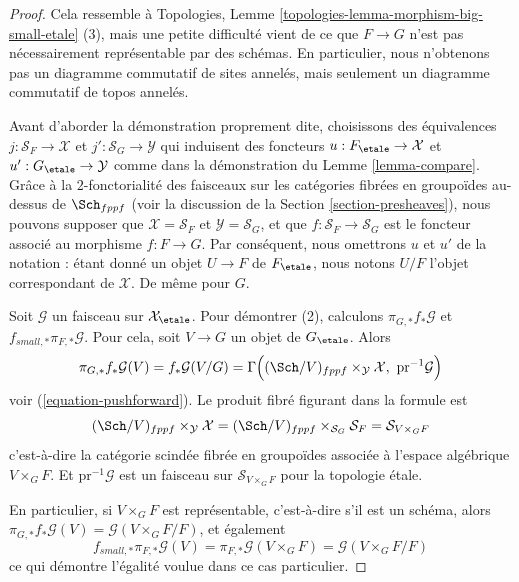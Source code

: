 \begin{proof}
Cela ressemble à
Topologies, Lemme \ref{topologies-lemma-morphism-big-small-etale} (3),
mais une petite difficulté vient de ce que $F \to G$ n'est pas nécessairement
représentable par des schémas. En particulier, nous n'obtenons pas un diagramme commutatif
de sites annelés, mais seulement un diagramme commutatif de topos annelés.

\medskip\noindent
Avant d'aborder la démonstration proprement dite, choisissons des équivalences
$j : \mathcal{S}_F \to \mathcal{X}$ et
$j' : \mathcal{S}_G \to \mathcal{Y}$ qui induisent des foncteurs
$u : F_\etale \to \mathcal{X}$ et
$u' : G_\etale \to \mathcal{Y}$ comme dans la démonstration du
Lemme \ref{lemma-compare}. Grâce à la $2$-fonctorialité des
faisceaux sur les catégories fibrées en groupoïdes au-dessus de $\Sch_{fppf}$
(voir la discussion de la Section \ref{section-presheaves}),
nous pouvons supposer que $\mathcal{X} = \mathcal{S}_F$ et
$\mathcal{Y} = \mathcal{S}_G$, et que $f : \mathcal{S}_F \to \mathcal{S}_G$
est le foncteur associé au morphisme $f : F \to G$. Par conséquent,
nous omettrons $u$ et $u'$ de la notation : étant donné un objet
$U \to F$ de $F_\etale$, nous notons $U/F$
l'objet correspondant de $\mathcal{X}$. De même pour $G$.

\medskip\noindent
Soit $\mathcal{G}$ un faisceau sur $\mathcal{X}_\etale$.
Pour démontrer (2), calculons $\pi_{G, *}f_*\mathcal{G}$ et
$f_{small, *}\pi_{F, *}\mathcal{G}$. Pour cela, soit $V \to G$ un objet
de $G_\etale$. Alors
$$
\pi_{G, *}f_*\mathcal{G}(V) = f_*\mathcal{G}(V/G) =
\Gamma\Big(
(\Sch/V)_{fppf} \times_{\mathcal{Y}} \mathcal{X},
\ \text{pr}^{-1}\mathcal{G}\Big)
$$
voir (\ref{equation-pushforward}). Le produit fibré figurant dans la formule est
$$
(\Sch/V)_{fppf} \times_{\mathcal{Y}} \mathcal{X} =
(\Sch/V)_{fppf} \times_{\mathcal{S}_G} \mathcal{S}_F =
\mathcal{S}_{V \times_G F}
$$
c'est-à-dire la catégorie scindée fibrée en groupoïdes associée à
l'espace algébrique $V \times_G F$. Et $\text{pr}^{-1}\mathcal{G}$ est un
faisceau sur $\mathcal{S}_{V \times_G F}$ pour la topologie étale.

\medskip\noindent
En particulier, si $V \times_G F$ est représentable, c'est-à-dire s'il est un schéma,
alors $\pi_{G, *}f_*\mathcal{G}(V) = \mathcal{G}(V \times_G F/F)$, et
également
$$
f_{small, *}\pi_{F, *}\mathcal{G}(V) =
\pi_{F, *}\mathcal{G}(V \times_G F) =
\mathcal{G}(V \times_G F/F)
$$
ce qui démontre l'égalité voulue dans ce cas particulier.


\end{proof}
